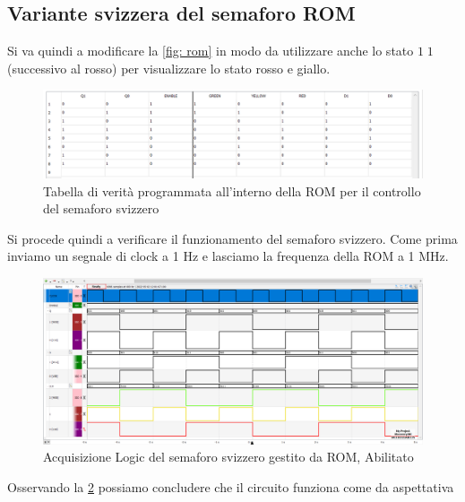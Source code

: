 \documentclass[10pt, a4paper, italian]{article}
\begin{document}
\subsection{Variante svizzera del semaforo ROM}
Si va quindi a modificare la \cref{fig: rom} in modo da utilizzare anche lo stato $1\;1$ (successivo al rosso) per visualizzare lo stato rosso e giallo.
\begin{figure}[htbp]
    \centering
    \includegraphics[width=\textwidth]{ROM.svizzero}
    \caption{Tabella di verità programmata all'interno della ROM per il controllo del semaforo svizzero
    \label{fig: rom.svizzero}}
\end{figure}
Si procede quindi a verificare il funzionamento del semaforo svizzero. Come prima inviamo un segnale di clock a 1 Hz e lasciamo la frequenza della ROM a 1 MHz.
\begin{figure}[htbp]
    \centering
    \includegraphics[width=\textwidth]{es2.svizzero}
    \caption{Acquisizione Logic del semaforo svizzero gestito da ROM, Abilitato
    \label{fig: es.2_svizzero}}
\end{figure}
Osservando la \cref{fig: es.2_svizzero} possiamo concludere che il circuito funziona come da aspettativa

\end{document}
